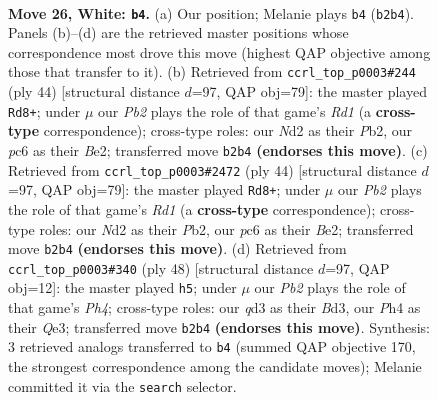 \documentclass[11pt]{article}
\begin{document}
\clearpage

\begin{figure}[p]\centering
\begin{subfigure}{0.46\textwidth}\centering
\resizebox{\linewidth}{!}{%
\newchessgame
\chessboard[
  setfen={6r1/1b3pk1/2p2rp1/p1P1Q2p/B6P/3q4/PP1N2P1/1RB3K1 w - - 1 26},
  showmover=false,
  pgfstyle=straightmove, color=movearrow, markmove={b2-b4}
]}
\caption{}
\end{subfigure}\hfill
\begin{subfigure}{0.46\textwidth}\centering
\resizebox{\linewidth}{!}{%
\newchessgame
\chessboard[
  setfen={r6k/1p3prp/p3bQ2/2q1p3/P3P3/2N5/1PP1B1PP/3R3K w - - 3 23},
  showmover=false,
  pgfstyle=straightmove, color=movearrow, markmove={d1-d8}
]}
\caption{}
\end{subfigure}
\\[4pt]
\begin{subfigure}{0.46\textwidth}\centering
\resizebox{\linewidth}{!}{%
\newchessgame
\chessboard[
  setfen={r6k/1p3prp/p3bQ2/2q1p3/P3P3/2N5/1PP1B1PP/3R3K w - - 7 23},
  showmover=false,
  pgfstyle=straightmove, color=movearrow, markmove={d1-d8}
]}
\caption{}
\end{subfigure}\hfill
\begin{subfigure}{0.46\textwidth}\centering
\resizebox{\linewidth}{!}{%
\newchessgame
\chessboard[
  setfen={r2rb1k1/p3pp1p/2p3p1/2N5/2P3PP/qP1BQP2/P7/1K5R w - - 4 25},
  showmover=false,
  pgfstyle=straightmove, color=movearrow, markmove={h4-h5}
]}
\caption{}
\end{subfigure}
\caption{\textbf{Move 26, White: \texttt{b4}.} (a) Our position; Melanie plays \texttt{b4} (\texttt{b2b4}). Panels (b)--(d) are the retrieved master positions whose correspondence most drove this move (highest QAP objective among those that transfer to it). (b) Retrieved from \texttt{ccrl\_top\_p0003\#244} (ply 44) [structural distance $d$=97, QAP obj=79]: the master played \texttt{Rd8+}; under $\mu$ our \emph{Pb2} plays the role of that game's \emph{Rd1} (a \textbf{cross-type} correspondence); cross-type roles: our \emph{N}d2 as their \emph{P}b2, our \emph{p}c6 as their \emph{B}e2; transferred move \texttt{b2b4} \textbf{(endorses this move)}. (c) Retrieved from \texttt{ccrl\_top\_p0003\#2472} (ply 44) [structural distance $d$=97, QAP obj=79]: the master played \texttt{Rd8+}; under $\mu$ our \emph{Pb2} plays the role of that game's \emph{Rd1} (a \textbf{cross-type} correspondence); cross-type roles: our \emph{N}d2 as their \emph{P}b2, our \emph{p}c6 as their \emph{B}e2; transferred move \texttt{b2b4} \textbf{(endorses this move)}. (d) Retrieved from \texttt{ccrl\_top\_p0003\#340} (ply 48) [structural distance $d$=97, QAP obj=12]: the master played \texttt{h5}; under $\mu$ our \emph{Pb2} plays the role of that game's \emph{Ph4}; cross-type roles: our \emph{q}d3 as their \emph{B}d3, our \emph{P}h4 as their \emph{Q}e3; transferred move \texttt{b2b4} \textbf{(endorses this move)}. Synthesis: 3 retrieved analogs transferred to \texttt{b4} (summed QAP objective 170, the strongest correspondence among the candidate moves); Melanie committed it via the \texttt{search} selector.}
\label{fig:thought-m50}
\end{figure}
\end{document}
